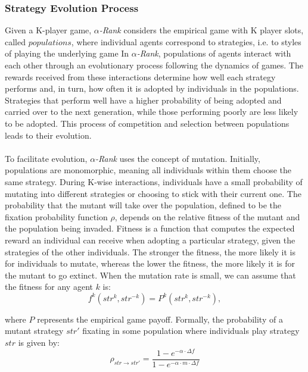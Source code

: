 \begin{flushleft}
\begin{flushleft}
    \end{flushleft}
        
    \subsubsection{Strategy Evolution Process}

    \begin{flushleft}

        Given a K-player game, \emph{$\alpha$-Rank} considers the empirical game with K player slots, called $populations$, where individual agents correspond to strategies, i.e. to styles of playing the underlying game In \emph{$\alpha$-Rank}, populations of agents interact with each other through an evolutionary process following the dynamics of games. The rewards received from these interactions determine how well each strategy performs and, in turn, how often it is adopted by individuals in the populations. Strategies that perform well have a higher probability of being adopted and carried over to the next generation, while those performing poorly are less likely to be adopted. This process of competition and selection between populations leads to their evolution.\\~\\

        To facilitate evolution, \emph{$\alpha$-Rank} uses the concept of mutation. Initially, populations are monomorphic, meaning all individuals within them choose the same strategy. During K-wise interactions, individuals have a small probability of mutating into different strategies or choosing to stick with their current one. The probability that the mutant will take over the population, defined to be the fixation probability function $\rho$, depends on the relative fitness of the mutant and the population being invaded. Fitness is a function that computes the expected reward an individual can receive when adopting a particular strategy, given the strategies of the other individuals. The stronger the fitness, the more likely it is for individuals to mutate, whereas the lower the fitness, the more likely it is for the mutant to go extinct. When the mutation rate is small, we can assume that the fitness for any agent $k$ is:
        \begin{equation}
            f^k(str^{k}, str^{-k}) = P^k(str^{k}, str^{-k}),
            \label{eq:fitness_k}
        \end{equation}

        where $P$ represents the empirical game payoff. Formally, the probability of a mutant strategy $str'$ fixating in some population where individuals play strategy $str$ is given by:
        \begin{equation}
            \rho_{str \to str'} = \frac{1 - e^{-\alpha \cdot \Delta f}}{1 - e^{-\alpha \cdot m \cdot \Delta f}} 
            \label{eq:fixation_prob}
        \end{equation}


\end{flushleft}
\end{flushleft}
